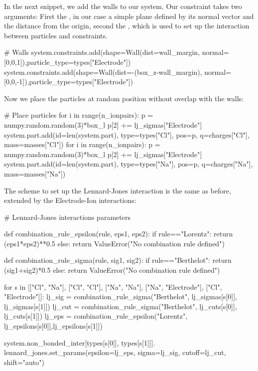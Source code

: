 \documentclass[
a4paper,                        %
11pt,                           %
twoside,                        %
footsepline,                    %
headsepline,                    %
headexclude,                    %
footexclude,                    %
pagesize,                       %
]{scrartcl}
\begin{document}
In the next snippet, we add the walls to our system. Our constraint takes two arguments: 
First the , in our case a simple plane defined by its normal vector and the distance from the origin, 
second the , which is used to set up the interaction between particles and constraints.

\begin{pypresso}
# Walls   
system.constraints.add(shape=Wall(dist=wall_margin,
            normal=[0,0,1]),particle_type=types["Electrode"])
system.constraints.add(shape=Wall(dist=-(box_z-wall_margin),
            normal=[0,0,-1]),particle_type=types["Electrode"])
\end{pypresso}

Now we place the particles at random position without overlap with the walls:

\begin{pypresso}
# Place particles
for i in range(n_ionpairs):
    p = numpy.random.random(3)*box_l
    p[2] += lj_sigmas["Electrode"]
    system.part.add(id=len(system.part), type=types["Cl"],  pos=p, q=charges["Cl"], mass=masses["Cl"])
for i in range(n_ionpairs):
    p = numpy.random.random(3)*box_l
    p[2] += lj_sigmas["Electrode"]
    system.part.add(id=len(system.part), type=types["Na"],  pos=p, q=charges["Na"], mass=masses["Na"])
\end{pypresso}

The scheme to set up the Lennard-Jones interaction is the same as before, 
extended by the Electrode-Ion interactions:

\begin{pypresso}
# Lennard-Jones interactions parameters 

def combination_rule_epsilon(rule, eps1, eps2):
    if rule=="Lorentz":
        return (eps1*eps2)**0.5
    else:
        return ValueError("No combination rule defined")

def combination_rule_sigma(rule, sig1, sig2):
    if rule=="Berthelot":
        return (sig1+sig2)*0.5
    else:
        return ValueError("No combination rule defined")

for s in [["Cl", "Na"], ["Cl", "Cl"], ["Na", "Na"], ["Na", "Electrode"], ["Cl", "Electrode"]]:
        lj_sig = combination_rule_sigma("Berthelot", 
                lj_sigmas[s[0]], lj_sigmas[s[1]])
        lj_cut = combination_rule_sigma("Berthelot", 
                lj_cuts[s[0]], lj_cuts[s[1]])
        lj_eps = combination_rule_epsilon("Lorentz", 
                lj_epsilons[s[0]],lj_epsilons[s[1]])

        system.non_bonded_inter[types[s[0]], types[s[1]]].
            lennard_jones.set_params(epsilon=lj_eps, 
            sigma=lj_sig, cutoff=lj_cut, shift="auto")
\end{pypresso}
\end{document}
